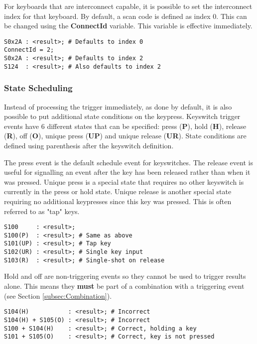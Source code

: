\documentclass{kiibohd-template}
\begin{document}
For keyboards that are interconnect capable, it is possible to set the interconnect index for that keyboard.
By default, a scan code is defined as index 0.
This can be changed using the \textbf{ConnectId} variable.
This variable is effective immediately.

\begin{lstlisting}
S0x2A : <result>; # Defaults to index 0
ConnectId = 2;
S0x2A : <result>; # Defaults to index 2
S124  : <result>; # Also defaults to index 2
\end{lstlisting}


\subsubsection{State Scheduling}
\label{subsubsec:ScanCodeStateScheduling}

Instead of processing the trigger immediately, as done by default, it is also possible to put additional state conditions on the keypress.
Keyswitch trigger events have 6 different states that can be specified: press (\textbf{P}), hold (\textbf{H}), release (\textbf{R}), off (\textbf{O}), unique press (\textbf{UP}) and unique release (\textbf{UR}).
State conditions are defined using parenthesis after the keyswitch definition.

The press event is the default schedule event for keyswitches.
The release event is useful for signalling an event after the key has been released rather than when it was pressed.
Unique press is a special state that requires no other keyswitch is currently in the press or hold state.
Unique release is another special state requiring no additional keypresses since this key was pressed.
This is often referred to as "tap" keys.

\begin{lstlisting}
S100     : <result>;
S100(P)  : <result>; # Same as above
S101(UP) : <result>; # Tap key
S102(UR) : <result>; # Single key input
S103(R)  : <result>; # Single-shot on release
\end{lstlisting}

Hold and off are non-triggering events so they cannot be used to trigger results alone.
This means they \textbf{must} be part of a combination with a triggering event (see Section \ref{subsec:Combination}).

\begin{lstlisting}
S104(H)           : <result>; # Incorrect
S104(H) + S105(O) : <result>; # Incorrect
S100 + S104(H)    : <result>; # Correct, holding a key
S101 + S105(O)    : <result>; # Correct, key is not pressed
\end{lstlisting}
\end{document}
